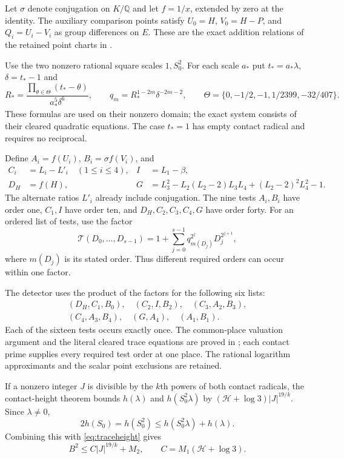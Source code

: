 \documentclass[11pt,a4paper]{article}
\theoremstyle{remark}\newtheorem{remark}[theorem]{Remark}
\newcommand{\Q}{\mathbb Q}\newcommand{\Z}{\mathbb Z}\newcommand{\HH}{\mathcal H}
\begin{document}
Let $\sigma$ denote conjugation on $K/\Q$ and let $f=1/x$, extended
by zero at the identity. The auxiliary comparison points satisfy
$U_0=H$, $V_0=H-P$, and $Q_i=U_i-V_i$ as group differences on $E$.
These are the exact addition relations of the retained point charts
in \cite{Baseline}.

Use the two nonzero rational square scales $1,S_0^2$. For each
scale $a_*$ put $t_*=a_*\lambda$, $\delta=t_*-1$ and
\[
 R_* =\frac{\prod_{\theta\in\Theta}(t_*-\theta)}{a_*^5\delta^6},
 \qquad q_m=R_*^{1-2m}\delta^{-2m-2},\qquad
 \Theta=\{0,-1/2,-1,1/2399,-32/407\}.
\]
These formulas are used on their nonzero domain; the exact system
consists of their cleared quadratic equations. The case $t_*=1$
has empty contact radical and requires no reciprocal.

Define $A_i=f(U_i)$, $B_i=\sigma f(V_i)$, and
\[
 \begin{aligned}
 C_i&=L_i-L'_i\quad(1\le i\le4),& I&=L_1-\beta,\\
 D_H&=f(H),&G&=L_3^2-L_2(L_2-2)L_3L_4+(L_2-2)^2L_4^2-1.
 \end{aligned}
\]
The alternate ratios $L'_i$ already include conjugation. The nine tests
$A_i,B_i$ have order one, $C_1,I$ have order ten, and $D_H,C_2,C_3,C_4,G$
have order forty. For an ordered list of tests, use the factor
\[
 \mathcal T(D_0,\ldots,D_{s-1})
 =1+\sum_{j=0}^{s-1}q_{m(D_j)}^{2^j}D_j^{2^{j+1}},
\]
where $m(D_j)$ is its stated order. Thus different required orders can
occur within one factor.

The detector uses the product of the factors for the following six lists:
\[
 \begin{gathered}
 (D_H,C_1,B_0),\quad(C_2,I,B_2),\quad(C_3,A_2,B_3),\\
 (C_4,A_3,B_4),\quad(G,A_4),\quad(A_1,B_1).
 \end{gathered}
\]
Each of the sixteen tests occurs exactly once. The common-place valuation
argument and the literal cleared trace equations are proved in
\cite{Packing}; each contact prime supplies every required test order
at one place. The rational logarithm approximants and the scalar point
exclusions are retained.

If a nonzero integer $J$ is divisible by the $k$th powers of both
contact radicals, the contact-height theorem bounds
$h(\lambda)$ and $h(S_0^2\lambda)$ by
$(\HH+\log3)|J|^{19/k}$. Since $\lambda\ne0$,
\[
 2h(S_0)=h(S_0^2)\le h(S_0^2\lambda)+h(\lambda).
\]
Combining this with \eqref{eq:traceheight} gives
\begin{equation}\label{eq:height}
 B^2\le C|J|^{19/k}+M_2,
 \qquad C=M_1(\HH+\log3).
\end{equation}
\end{document}

